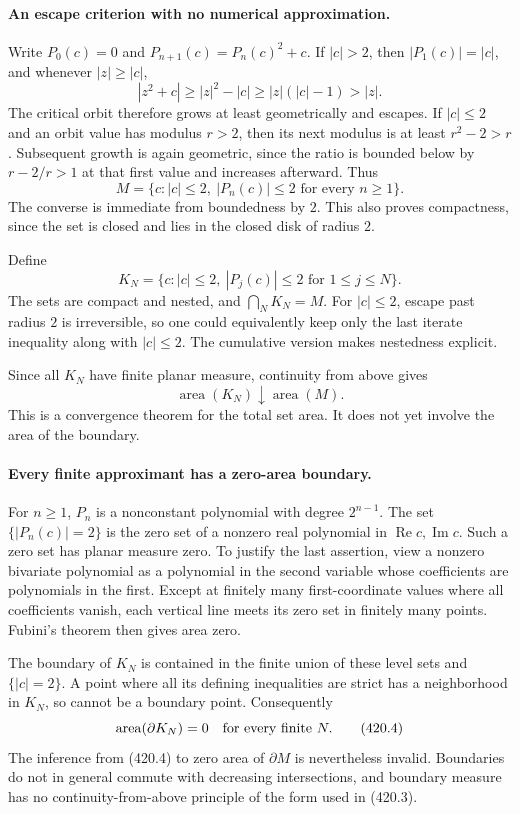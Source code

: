 \documentclass[11pt]{article}
\begin{document}
\paragraph{An escape criterion with no numerical approximation.}
Write $P_0(c)=0$ and $P_{n+1}(c)=P_n(c)^2+c$. If $|c|>2$, then $|P_1(c)|=|c|$, and whenever $|z|\ge|c|$,
\[
 |z^2+c|\ge|z|^2-|c|\ge |z|(|c|-1)>|z|.
\]
The critical orbit therefore grows at least geometrically and escapes. If $|c|\le2$ and an orbit value has modulus $r>2$, then its next modulus is at least $r^2-2>r$. Subsequent growth is again geometric, since the ratio is bounded below by $r-2/r>1$ at that first value and increases afterward. Thus
\[
 M=\{c:|c|\le2,\ |P_n(c)|\le2\text{ for every }n\ge1\}.
 \tag{420.1}
\]
The converse is immediate from boundedness by $2$. This also proves compactness, since the set is closed and lies in the closed disk of radius $2$.

Define
\[
 K_N=\{c:|c|\le2,\ |P_j(c)|\le2\text{ for }1\le j\le N\}.
 \tag{420.2}
\]
The sets are compact and nested, and $\bigcap_NK_N=M$. For $|c|\le2$, escape past radius $2$ is irreversible, so one could equivalently keep only the last iterate inequality along with $|c|\le2$. The cumulative version makes nestedness explicit.

Since all $K_N$ have finite planar measure, continuity from above gives
\[
 \operatorname{area}(K_N)\downarrow\operatorname{area}(M).
 \tag{420.3}
\]
This is a convergence theorem for the total set area. It does not yet involve the area of the boundary.

\paragraph{Every finite approximant has a zero-area boundary.}
For $n\ge1$, $P_n$ is a nonconstant polynomial with degree $2^{n-1}$. The set $\{|P_n(c)|=2\}$ is the zero set of a nonzero real polynomial in $\operatorname{Re}c,\operatorname{Im}c$. Such a zero set has planar measure zero. To justify the last assertion, view a nonzero bivariate polynomial as a polynomial in the second variable whose coefficients are polynomials in the first. Except at finitely many first-coordinate values where all coefficients vanish, each vertical line meets its zero set in finitely many points. Fubini's theorem then gives area zero.

The boundary of $K_N$ is contained in the finite union of these level sets and $\{|c|=2\}$. A point where all its defining inequalities are strict has a neighborhood in $K_N$, so cannot be a boundary point. Consequently
\[
 \operatorname{area}(\partial K_N)=0\quad\hbox{for every finite }N.
 \tag{420.4}
\]
The inference from (420.4) to zero area of $\partial M$ is nevertheless invalid. Boundaries do not in general commute with decreasing intersections, and boundary measure has no continuity-from-above principle of the form used in (420.3).
\end{document}
